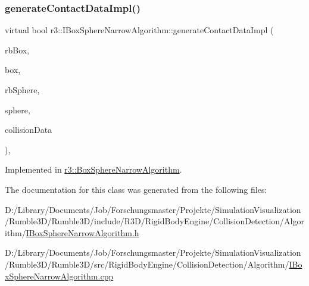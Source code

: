 \subsubsection{\texorpdfstring{generate\+Contact\+Data\+Impl()}{generateContactDataImpl()}}
{\footnotesize\ttfamily virtual bool r3\+::\+I\+Box\+Sphere\+Narrow\+Algorithm\+::generate\+Contact\+Data\+Impl (\begin{DoxyParamCaption}\item[{\mbox{\hyperlink{classr3_1_1_rigid_body}{Rigid\+Body}} $\ast$}]{rb\+Box,  }\item[{\mbox{\hyperlink{classr3_1_1_collision_box}{Collision\+Box}} $\ast$}]{box,  }\item[{\mbox{\hyperlink{classr3_1_1_rigid_body}{Rigid\+Body}} $\ast$}]{rb\+Sphere,  }\item[{\mbox{\hyperlink{classr3_1_1_collision_sphere}{Collision\+Sphere}} $\ast$}]{sphere,  }\item[{\mbox{\hyperlink{classr3_1_1_collision_data}{Collision\+Data}} \&}]{collision\+Data }\end{DoxyParamCaption})\hspace{0.3cm}{\ttfamily [protected]}, {}}



Implemented in \mbox{\hyperlink{classr3_1_1_box_sphere_narrow_algorithm_a2fc345fdec27e85f0e569afa0d500865}{r3\+::\+Box\+Sphere\+Narrow\+Algorithm}}.



The documentation for this class was generated from the following files\+:\begin{DoxyCompactItemize}
\item 
D\+:/\+Library/\+Documents/\+Job/\+Forschungsmaster/\+Projekte/\+Simulation\+Visualization/\+Rumble3\+D/\+Rumble3\+D/include/\+R3\+D/\+Rigid\+Body\+Engine/\+Collision\+Detection/\+Algorithm/\mbox{\hyperlink{_i_box_sphere_narrow_algorithm_8h}{I\+Box\+Sphere\+Narrow\+Algorithm.\+h}}\item 
D\+:/\+Library/\+Documents/\+Job/\+Forschungsmaster/\+Projekte/\+Simulation\+Visualization/\+Rumble3\+D/\+Rumble3\+D/src/\+Rigid\+Body\+Engine/\+Collision\+Detection/\+Algorithm/\mbox{\hyperlink{_i_box_sphere_narrow_algorithm_8cpp}{I\+Box\+Sphere\+Narrow\+Algorithm.\+cpp}}\end{DoxyCompactItemize}
